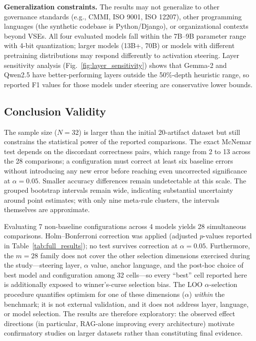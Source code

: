 \documentclass{ieeeaccess}
\begin{document}
\textbf{Generalization constraints.} The results may not generalize to other governance standards (e.g., CMMI, ISO 9001, ISO 12207), other programming languages (the synthetic codebase is Python/Django), or organizational contexts beyond VSEs. All four evaluated models fall within the 7B--9B parameter range with 4-bit quantization; larger models (13B+, 70B) or models with different pretraining distributions may respond differently to activation steering. Layer sensitivity analysis (Fig.~\ref{fig:layer_sensitivity}) shows that Gemma-2 and Qwen2.5 have better-performing layers outside the 50\%-depth heuristic range, so reported F1 values for those models under steering are conservative lower bounds.

\subsection{Conclusion Validity}

The sample size ($N=32$) is larger than the initial 20-artifact dataset but still constrains the statistical power of the reported comparisons. The exact McNemar test depends on the discordant correctness pairs, which range from 2 to 13 across the 28 comparisons; a configuration must correct at least six baseline errors without introducing any new error before reaching even uncorrected significance at $\alpha=0.05$. Smaller accuracy differences remain undetectable at this scale. The grouped bootstrap intervals remain wide, indicating substantial uncertainty around point estimates; with only nine meta-rule clusters, the intervals themselves are approximate.

Evaluating 7 non-baseline configurations across 4 models yields 28 simultaneous comparisons. Holm--Bonferroni correction was applied (adjusted $p$-values reported in Table~\ref{tab:full_results}); no test survives correction at $\alpha=0.05$. Furthermore, the $m=28$ family does not cover the other selection dimensions exercised during the study---steering layer, $\alpha$ value, anchor language, and the post-hoc choice of best model and configuration among 32 cells---so every ``best'' cell reported here is additionally exposed to winner's-curse selection bias. The LOO $\alpha$-selection procedure quantifies optimism for one of these dimensions ($\alpha$) \emph{within} the benchmark; it is not external validation, and it does not address layer, language, or model selection. The results are therefore exploratory: the observed effect directions (in particular, RAG-alone improving every architecture) motivate confirmatory studies on larger datasets rather than constituting final evidence.
\end{document}
